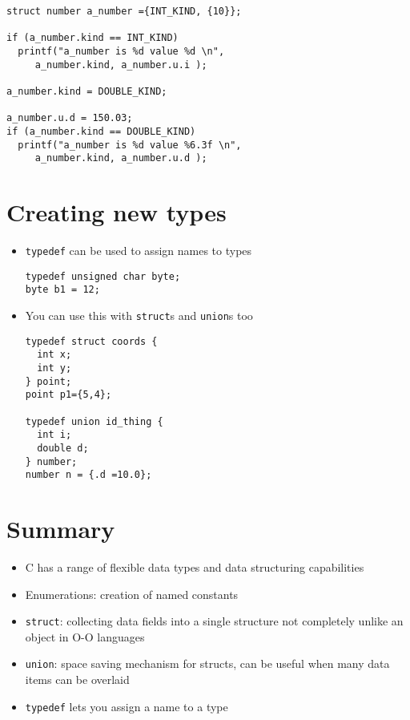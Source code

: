 \documentclass{article}
\begin{document}
\begin{verbatim}
struct number a_number ={INT_KIND, {10}};

if (a_number.kind == INT_KIND)
  printf("a_number is %d value %d \n", 
     a_number.kind, a_number.u.i );

a_number.kind = DOUBLE_KIND;

a_number.u.d = 150.03;
if (a_number.kind == DOUBLE_KIND)
  printf("a_number is %d value %6.3f \n", 
     a_number.kind, a_number.u.d );
\end{verbatim}



\section{Creating new types}
\begin{itemize}
\item \verb!typedef! can be used to assign names to types
\begin{verbatim}
typedef unsigned char byte;
byte b1 = 12;
\end{verbatim}
\item You can use this with \verb!struct!s and \verb!union!s too
\begin{verbatim}
typedef struct coords {
  int x;
  int y;
} point;
point p1={5,4};

typedef union id_thing {
  int i;
  double d;
} number;
number n = {.d =10.0};
\end{verbatim}
\end{itemize}



\section{Summary}
\begin{itemize}
\item C has a range of flexible data types and data structuring capabilities
\item Enumerations: creation of named constants 
\item \verb!struct!: collecting data fields into a single structure not completely unlike an object in O-O languages
\item \verb!union!: space saving mechanism for structs, can be useful when many data items can be overlaid
\item \verb!typedef! lets you assign a name to a type 
\end{itemize}
\end{document}
